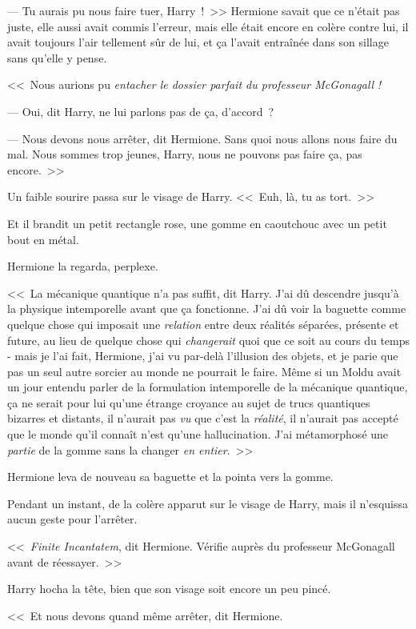 --- Tu aurais pu nous faire tuer, Harry~!~>> Hermione savait que ce n'était pas juste, elle aussi avait commis l'erreur, mais elle était encore en colère contre lui, il avait toujours l'air tellement sûr de lui, et ça l'avait entraînée dans son sillage sans qu'elle y pense.

<<~Nous aurions pu \emph{entacher le dossier parfait du professeur McGonagall} \emph{!}

--- Oui, dit Harry, ne lui parlons pas de ça, d'accord~?

--- Nous devons nous arrêter, dit Hermione. Sans quoi nous allons nous faire du mal. Nous sommes trop jeunes, Harry, nous ne pouvons pas faire ça, pas encore.~>>

Un faible sourire passa sur le visage de Harry. <<~Euh, là, tu as tort.~>>

Et il brandit un petit rectangle rose, une gomme en caoutchouc avec un petit bout en métal.

Hermione la regarda, perplexe.

<<~La mécanique quantique n'a pas suffit, dit Harry. J'ai dû descendre jusqu'à la physique intemporelle avant que ça fonctionne. J'ai dû voir la baguette comme quelque chose qui imposait une \emph{relation} entre deux réalités séparées, présente et future, au lieu de quelque chose qui \emph{changerait} quoi que ce soit au cours du temps - mais je l'ai fait, Hermione, j'ai vu par-delà l'illusion des objets, et je parie que pas un seul autre sorcier au monde ne pourrait le faire. Même si un Moldu avait un jour entendu parler de la formulation intemporelle de la mécanique quantique, ça ne serait pour lui qu'une étrange croyance au sujet de trucs quantiques bizarres et distants, il n'aurait pas \emph{vu} que c'est la \emph{réalité}, il n'aurait pas accepté que le monde qu'il connaît n'est qu'une hallucination. J'ai métamorphosé une \emph{partie} de la gomme sans la changer \emph{en entier}.~>>

Hermione leva de nouveau sa baguette et la pointa vers la gomme.

Pendant un instant, de la colère apparut sur le visage de Harry, mais il n'esquissa aucun geste pour l'arrêter.

<<~\emph{Finite Incantatem}, dit Hermione. Vérifie auprès du professeur McGonagall avant de réessayer.~>>

Harry hocha la tête, bien que son visage soit encore un peu pincé.

<<~Et nous devons quand même arrêter, dit Hermione.

